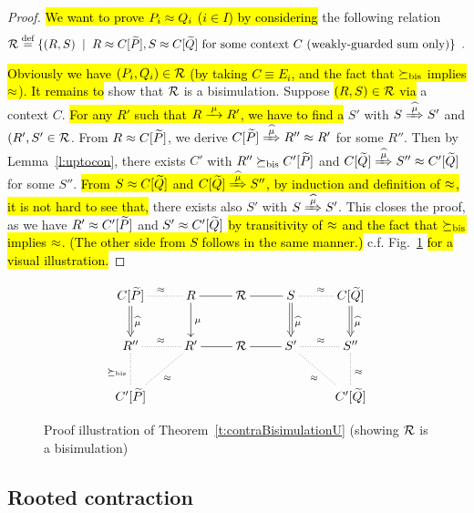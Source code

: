 \begin{proof}
\hl{We want to prove $P_i \approx Q_i$ ($i \in I$) by considering} the following relation
\begin{equation*}
{\cal R} \stackrel{\mbox{\scriptsize def}}{=} \{(R,S) \; \mid \; R \approx C [\widetilde P], S \approx C [\widetilde Q] \mbox{~for some context
$C$ (weakly-guarded sum only)} \} \enspace.
\end{equation*}

\hl{Obviously we have $(P_i,Q_i) \in {\cal R}$ (by taking $C \equiv E_i$, and
the fact that $\mathrel{\succeq_{\rm{bis}}}$ implies $\approx$). It remains to}
show that ${\cal R}$ is a bisimulation. Suppose \hl{$(R, S) \in {\cal R}$ via} a context
$C$. \hl{For any $R'$ such that $R \arr{\mu} R'$, we have to find a} $S'$ with $S \Arcap{\mu}
S'$ and $(R', S' \in {\cal R}$. From $R \approx C[{\widetilde P}]$, we derive $C[{\til P}]
\Arcap{\mu} R'' \wb R'$ for some $R''$. Then by Lemma~\ref{l:uptocon},
there exists $C'$ with $R'' \mathrel{\succeq_{\rm{bis}}} C'[{\widetilde P}]$ and $C[{\til Q}]
\Arcap{\mu} S'' \wb C'[{\til Q}]$ for some $S''$. \hl{From $S \approx C[{\widetilde
  Q}]$ and $C[{\til Q}] \Arcap{\mu} S''$, by induction and definition of $\approx$, it is not
hard to see that,}
there exists also $S'$ with $S \Arcap{\mu} S'$. This closes the
proof, as we have $R' \approx C'[{\widetilde P}]$ and $S' \approx C'[{\widetilde Q}]$ \hl{by
transitivity of $\approx$ and the fact that $\mathrel{\succeq_{\rm{bis}}}$ implies $\approx$.
(The other side from $S$ follows in the same manner.)}
c.f. Fig.~\ref{fig:310} \hl{for a visual illustration.}
\end{proof}

\begin{figure}[ht]
\begin{displaymath}
  \xymatrix{
    {C[{\til P}]} \ar@{.}[r]^{\wb} \ar@{=>}[d]^{\widehat{\mu}} & {R} \ar@{-}[r]
    \ar@{->}[d]^{\mu} & {\R} \ar@{-}[r] & {S} \ar@{.}[r]^{\wb}
    \ar@{=>}[d]^{\widehat{\mu}} & {C[{\til Q}]} \ar@{=>}[d]^{\widehat{\mu}} \\
    {R''} \ar@{.}[d]_{\mcontrBIS} \ar@{.}[r]^{\wb} & {R'} \ar@{-}[r]
    \ar@{.}[ld]^{\wb} & {\R} \ar@{-}[r] & {S'} \ar@{.}[r]^{\wb} \ar@{.}[rd]_{\wb}
    & {S''} \ar@{.}[d]^{\wb} \\
    {C'[{\til P}]} & {} & {} & {} & {C'[{\til Q}]}
  }
\end{displaymath}
\caption{Proof illustration of Theorem~\ref{t:contraBisimulationU}
  (showing ${\cal R}$ is a bisimulation)}
\label{fig:310}
\end{figure}

\subsection{Rooted contraction}
\label{ss:new}

